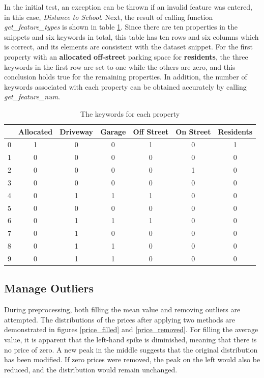 \documentclass[12pt,twoside]{report}
\begin{document}
In the initial test, an exception can be thrown if an invalid feature was entered, in this case, \textit{Distance to School}. Next, the result of calling function \textit{get\_feature\_types} is shown in table \ref{parking_types}. Since there are ten properties in the snippets and six keywords in total, this table has ten rows and six columns which is correct, and its elements are consistent with the dataset snippet. For the first property with an \textbf{allocated} \textbf{off-street} parking space for \textbf{residents}, the three keywords in the first row are set to one while the others are zero, and this conclusion holds true for the remaining properties. In addition, the number of keywords associated with each property can be obtained accurately by calling \textit{get\_feature\_num}. 

\begin{table}[!htbp]
	\centering
	\caption{The keywords for each property}
	\label{parking_types}
	\begin{tabular}{| c | c | c | c | c | c | c |}
		\hline
		& Allocated & Driveway & Garage & Off Street & On Street & Residents\\
		\hline
		0 & 1 & 0 & 0 & 1 & 0 & 1 \\ 
		\hline
		1 & 0 & 0 & 0 & 0 & 0 & 0 \\
		\hline
		2 & 0 & 0 & 0 & 0 & 1 & 0 \\
		\hline
		3 & 0 & 0 & 0 & 0 & 0 & 0 \\
		\hline
		4 & 0 & 1 & 1 & 1 & 0 & 0 \\
		\hline
		5 & 0 & 0 & 0 & 0 & 0 & 0 \\
		\hline
		6 & 0 & 1 & 1 & 1 & 0 & 0 \\
		\hline
		7 & 0 & 1 & 0 & 0 & 0 & 0 \\
		\hline
		8 & 0 & 1 & 1 & 0 & 0 & 0 \\
		\hline
		9 & 0 & 1 & 1 & 0 & 0 & 0 \\
		\hline
	\end{tabular}
\end{table}

\subsection{Manage Outliers}
During preprocessing, both filling the mean value and removing outliers are attempted. The distributions of the prices after applying two methods are demonstrated in figures \ref{price_filled} and \ref{price_removed}. For filling the average value, it is apparent that the left-hand spike is diminished, meaning that there is no price of zero. A new peak in the middle suggests that the original distribution has been modified. If zero prices were removed, the peak on the left would also be reduced, and the distribution would remain unchanged. 
\\
\end{document}
